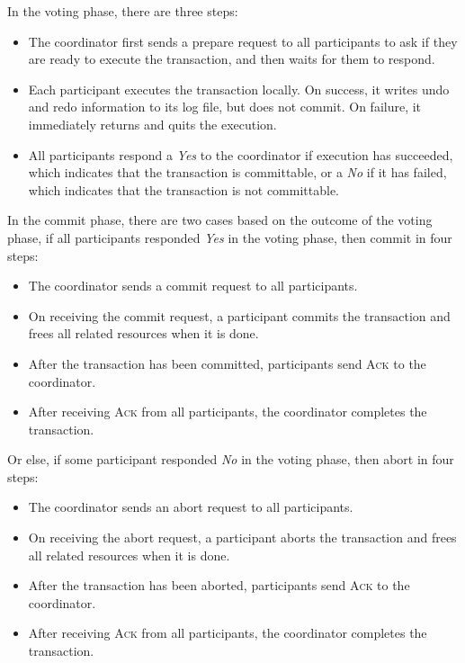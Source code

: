 \documentclass[11pt]{article}
\begin{document}
    \noindent In the voting phase, there are three steps:
    \begin{itemize}
      \item The coordinator first sends a prepare request to all participants to ask if they are ready to execute the transaction, and then waits for them to respond.
      \item Each participant executes the transaction locally. On success, it writes undo and redo information to its log file, but does not commit. On failure, it immediately returns and quits the execution.
      \item All participants respond a \textit{Yes} to the coordinator if execution has succeeded, which indicates that the transaction is committable, or a \textit{No} if it has failed, which indicates that the transaction is not committable.
    \end{itemize}

    \noindent In the commit phase, there are two cases based on the outcome of the voting phase, if all participants responded \textit{Yes} in the voting phase, then commit in four steps:
    \begin{itemize}
      \item The coordinator sends a commit request to all participants.
      \item On receiving the commit request, a participant commits the transaction and frees all related resources when it is done.
      \item After the transaction has been committed, participants send \textsc{Ack} to the coordinator.
      \item After receiving \textsc{Ack} from all participants, the coordinator completes the transaction.
    \end{itemize}

    \noindent Or else, if some participant responded \textit{No} in the voting phase, then abort in four steps:
    \begin{itemize}
      \item The coordinator sends an abort request to all participants.
      \item On receiving the abort request, a participant aborts the transaction and frees all related resources when it is done.
      \item After the transaction has been aborted, participants send \textsc{Ack} to the coordinator.
      \item After receiving \textsc{Ack} from all participants, the coordinator completes the transaction.
    \end{itemize}
\end{document}
